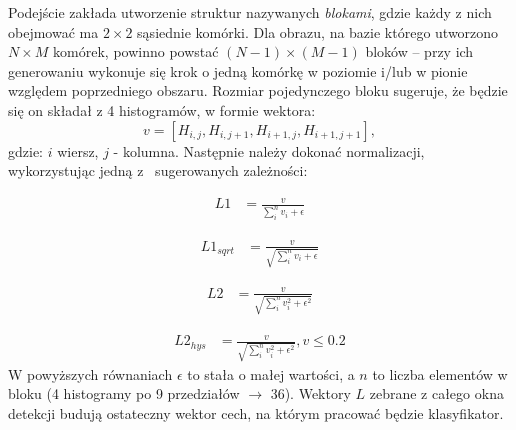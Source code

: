 Podejście zakłada utworzenie struktur nazywanych \textit{blokami}, gdzie każdy z nich obejmować ma $2 \times 2$ sąsiednie komórki. 
Dla obrazu, na bazie którego utworzono $N \times M$ komórek, powinno powstać $(N-1) \times(M-1)$ bloków -- przy ich generowaniu wykonuje się krok o jedną komórkę w poziomie i/lub w pionie względem poprzedniego obszaru. 
Rozmiar pojedynczego bloku sugeruje, że będzie się on składał z 4 histogramów, w formie wektora: 
\begin{equation}
v=[H_{i,j}, H_{i,j+1}, H_{i+1,j}, H_{i+1,j+1}],
\end{equation} 
gdzie: $i$  wiersz, $j$ - kolumna. Następnie należy dokonać normalizacji, wykorzystując jedną z~ sugerowanych zależności: 

\begin{equation}
\label{eq:HOG_norm1}
\left.\begin{aligned} 
L1&=\frac{v}{\sum_{i}^{n}v_i+\epsilon}
\end{aligned}\right.
\end{equation}

\begin{equation}
\label{eq:HOG_norm2}
\left.\begin{aligned} 
L1_{sqrt}&=\frac{v}{\sqrt{\sum_{i}^{n}v_i+\epsilon}}
\end{aligned}\right.
\end{equation}

\begin{equation}
\label{eq:HOG_norm3}
\left.\begin{aligned} 
L2&=\frac{v}{\sqrt{\sum_{i}^{n}v_i^2+\epsilon^2}}
\end{aligned}\right.
\end{equation}

\begin{equation}
\label{eq:HOG_norm4}
\left.\begin{aligned} 
L2_{hys}&=\frac{v}{\sqrt{\sum_{i}^{n}v_i^2+\epsilon^2}}, v\leq 0.2
\end{aligned}\right.
\end{equation}
W powyższych równaniach $\epsilon$ to stała o małej wartości, a $n$ to liczba elementów w bloku (4 histogramy po 9 przedziałów $\rightarrow$ 36). Wektory $L$ zebrane z całego okna detekcji budują ostateczny wektor cech, na którym pracować będzie klasyfikator.

